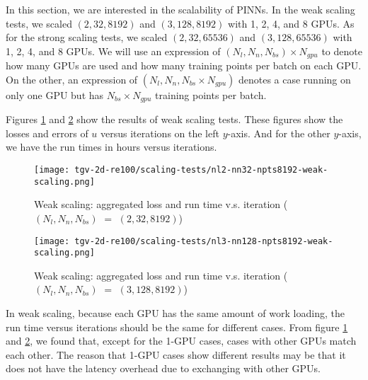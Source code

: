 
In this section, we are interested in the scalability of PINNs.
In the weak scaling tests, we scaled $(2, 32, 8192)$ and $(3, 128, 8192)$ with 1, 2, 4, and 8 GPUs. 
As for the strong scaling tests, we scaled $(2, 32, 65536)$ and $(3, 128, 65536)$ with 1, 2, 4, and 8 GPUs. 
We will use an expression of $(N_l, N_n, N_{bs})\times N_{gpu}$ to denote how many GPUs are used and how many training points per batch on each GPU.
On the other, an expression of $(N_l, N_n, N_{bs}\times N_{gpu})$ denotes a case running on only one GPU but has $N_{bs}\times N_{gpu}$ training points per batch.

Figures \ref{fig:nl2-nn32-npts8192-weak-scaling} and \ref{fig:nl3-nn128-npts8192-weak-scaling} show the results of weak scaling tests.
These figures show the losses and errors of $u$ versus iterations on the left $y$-axis.
And for the other $y$-axis, we have the run times in hours versus iterations.

\begin{figure}[hbt!]
    \centering%
    \texttt{[image: tgv-2d-re100/scaling-tests/nl2-nn32-npts8192-weak-scaling.png]}
    \caption[%
        Weak scaling: aggregated loss and run time v.s. iteration ($(N_l, N_n, N_{bs})$ $=$ $(2, 32, 8192)$)%
    ]{%
        Weak scaling: aggregated loss and run time v.s. iteration ($(N_l, N_n, N_{bs})$ $=$ $(2, 32, 8192)$)%
    }\label{fig:nl2-nn32-npts8192-weak-scaling}
\end{figure}

\begin{figure}[hbt!]
    \centering%
    \texttt{[image: tgv-2d-re100/scaling-tests/nl3-nn128-npts8192-weak-scaling.png]}
    \caption[%
        Weak scaling: aggregated loss and run time v.s. iteration ($(N_l, N_n, N_{bs})$ $=$ $(3, 128, 8192)$)%
    ]{%
        Weak scaling: aggregated loss and run time v.s. iteration ($(N_l, N_n, N_{bs})$ $=$ $(3, 128, 8192)$)%
    }\label{fig:nl3-nn128-npts8192-weak-scaling}
\end{figure}

In weak scaling, because each GPU has the same amount of work loading, the run time versus iterations should be the same for different cases.
From figure \ref{fig:nl2-nn32-npts8192-weak-scaling} and \ref{fig:nl3-nn128-npts8192-weak-scaling}, we found that, except for the 1-GPU cases, cases with other GPUs match each other.
The reason that 1-GPU cases show different results may be that it does not have the latency overhead due to exchanging with other GPUs.

